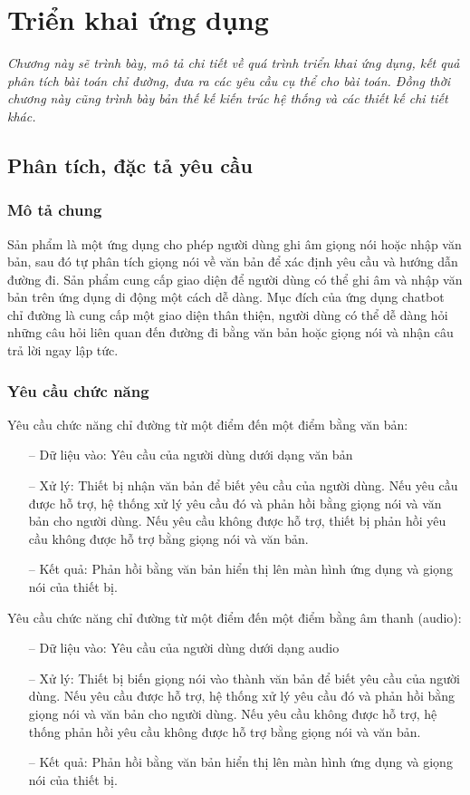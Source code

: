 \chapter{Triển khai ứng dụng}
\label{Chapter5}

\emph{Chương này sẽ trình bày, mô tả chi tiết về quá trình triển khai ứng dụng, kết quả phân tích bài toán chỉ đường, đưa ra các yêu cầu cụ thể cho bài toán. Đồng thời chương này cũng trình bày bản thế kế kiến trúc hệ thống và các thiết kế chi tiết khác.}

\section{Phân tích, đặc tả yêu cầu}

\subsection{Mô tả chung}
Sản phẩm là một ứng dụng cho phép người dùng ghi âm giọng nói hoặc nhập văn bản, sau đó tự phân tích giọng nói về văn bản để xác định yêu cầu và hướng dẫn đường đi. Sản phẩm cung cấp giao diện để người dùng có thể ghi âm và nhập văn bản trên ứng dụng di động một cách dễ dàng.
Mục đích của ứng dụng chatbot chỉ đường là cung cấp một giao diện thân thiện, người dùng có thể dễ dàng hỏi những câu hỏi liên quan đến đường đi bằng văn bản hoặc giọng nói và nhận câu trả lời ngay lập tức.
\subsection{Yêu cầu chức năng}

Yêu cầu chức năng chỉ đường từ một điểm đến một điểm bằng văn bản:
\begin{itemize}
    \item[--] Dữ liệu vào: Yêu cầu của người dùng dưới dạng văn bản
    \item[--] Xử lý: Thiết bị nhận văn bản để biết yêu cầu của người dùng. Nếu yêu cầu được hỗ trợ, hệ thống xử lý yêu cầu đó và phản hồi bằng giọng nói và văn bản cho người dùng. Nếu yêu cầu không được hỗ trợ, thiết bị phản hồi yêu cầu không được hỗ trợ bằng giọng nói và văn bản.
    \item[--] Kết quả: Phản hồi bằng văn bản hiển thị lên màn hình ứng dụng và giọng nói của thiết bị.
\end{itemize}
Yêu cầu chức năng chỉ đường từ một điểm đến một điểm bằng âm thanh (audio):
\begin{itemize}
    \item[--] Dữ liệu vào: Yêu cầu của người dùng dưới dạng audio
    \item[--] Xử lý: Thiết bị biến giọng nói vào thành văn bản để biết yêu cầu của người dùng. Nếu yêu cầu được hỗ trợ, hệ thống xử lý yêu cầu đó và phản hồi bằng giọng nói và văn bản cho người dùng. Nếu yêu cầu không được hỗ trợ, hệ thống phản hồi yêu cầu không được hỗ trợ bằng giọng nói và văn bản.
    \item[--] Kết quả: Phản hồi bằng văn bản hiển thị lên màn hình ứng dụng và giọng nói của thiết bị.
\end{itemize}

